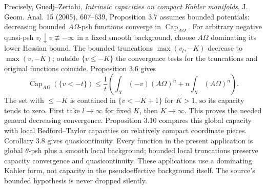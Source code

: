 \documentclass[
  11pt,
]{article}
\begin{document}
Precisely, Guedj--Zeriahi, \emph{Intrinsic capacities on compact Kahler
manifolds}, J. Geom. Anal. 15 (2005), 607--639, Proposition 3.7 assumes
bounded potentials: decreasing bounded \(A\Omega\)-psh functions
converge in \(\operatorname{Cap}_{A\Omega}\). For arbitrary negative
quasi-psh \(v_l\downarrow v\not\equiv-\infty\) in a fixed smooth
background, choose \(A\Omega\) dominating its lower Hessian bound. The
bounded truncations \(\max(v_l,-K)\) decrease to \(\max(v,-K)\); outside
\(\{v\leq-K\}\) the convergence tests for the truncations and original
functions coincide. Proposition 3.6 gives \[
\operatorname{Cap}_{A\Omega}(\{v<-t\})\leq
\frac{1}{t}\left(\int_X(-v)(A\Omega)^n+n\int_X(A\Omega)^n\right).
\] The set with \(\leq-K\) is contained in \(\{v<-K+1\}\) for \(K>1\),
so its capacity tends to zero. First take \(l\to\infty\) for fixed
\(K\), then \(K\to\infty\). This proves the needed general decreasing
convergence. Proposition 3.10 compares this global capacity with local
Bedford--Taylor capacities on relatively compact coordinate pieces.
Corollary 3.8 gives quasicontinuity. Every function in the present
application is global \(\theta\)-psh plus a smooth local background;
bounded local truncations preserve capacity convergence and
quasicontinuity. These applications use a dominating Kahler form, not
capacity in the pseudoeffective background itself. The source's bounded
hypothesis is never dropped silently.
\end{document}
